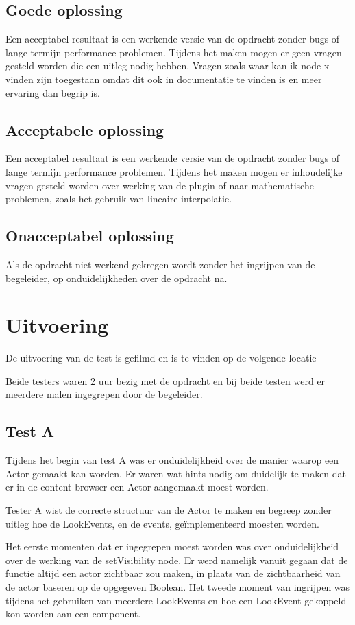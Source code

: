 \subsection{Goede oplossing}
Een acceptabel resultaat is een werkende versie van de opdracht zonder bugs of lange termijn performance problemen. Tijdens het maken mogen er geen vragen gesteld worden die een uitleg nodig hebben. Vragen zoals waar kan ik node x vinden zijn toegestaan omdat dit ook in documentatie te vinden is en meer ervaring dan begrip is. 

\subsection{Acceptabele oplossing}
Een acceptabel resultaat is een werkende versie van de opdracht zonder bugs of lange termijn performance problemen. Tijdens het maken mogen er inhoudelijke vragen gesteld worden over werking van de plugin of naar mathematische problemen, zoals het gebruik van lineaire interpolatie.

\subsection{Onacceptabel oplossing}
Als de opdracht niet werkend gekregen wordt zonder het ingrijpen van de begeleider, op onduidelijkheden over de opdracht na.  

\section{Uitvoering}
De uitvoering van de test is gefilmd en is te vinden op de volgende locatie 

Beide testers waren 2 uur bezig met de opdracht en bij beide testen werd er meerdere malen ingegrepen door de begeleider.

\subsection{Test A}
Tijdens het begin van test A was er onduidelijkheid over de manier waarop een Actor gemaakt kan worden. Er waren wat hints nodig om duidelijk te maken dat er in de content browser een Actor aangemaakt moest worden.

Tester A wist de correcte structuur van de Actor te maken en begreep zonder uitleg hoe de LookEvents, en de events, geïmplementeerd moesten worden. 

Het eerste momenten dat er ingegrepen moest worden was over onduidelijkheid over de werking van de setVisibility node. Er werd namelijk vanuit gegaan dat de functie altijd een actor zichtbaar zou maken, in plaats van de zichtbaarheid van de actor baseren op de opgegeven Boolean. Het tweede moment van ingrijpen was tijdens het gebruiken van meerdere LookEvents en hoe een LookEvent gekoppeld kon worden aan een component. 

